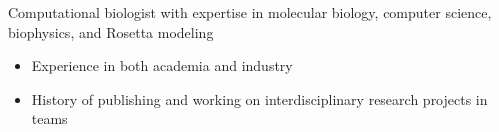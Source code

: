 
Computational biologist with expertise in molecular biology, computer science, biophysics, and Rosetta modeling
\begin{itemize}
\item Experience in both academia and industry
\item History of publishing and working on interdisciplinary research projects in teams
\end{itemize}
